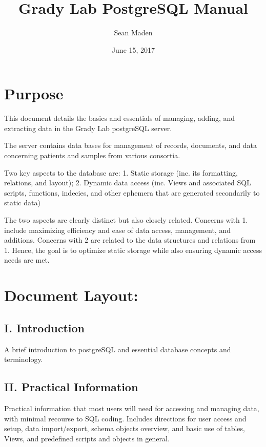 \documentclass[]{article}
\title{Grady Lab PostgreSQL Manual}
\author{Sean Maden}
\date{June 15, 2017}
\begin{document}
\maketitle

\section{Purpose}\label{purpose}

This document details the basics and essentials of managing, adding, and
extracting data in the Grady Lab postgreSQL server.

The server contains data bases for management of records, documents, and
data concerning patients and samples from various consortia.

Two key aspects to the database are: 1. Static storage (inc. its
formatting, relations, and layout); 2. Dynamic data access (inc. Views
and associated SQL scripts, functions, indecies, and other ephemera that
are generated secondarily to static data)

The two aspects are clearly distinct but also closely related. Concerns
with 1. include maximizing efficiency and ease of data access,
management, and additions. Concerns with 2 are related to the data
structures and relations from 1. Hence, the goal is to optimize static
storage while also ensuring dynamic access needs are met.

\section{Document Layout:}\label{document-layout}

\subsection{I. Introduction}\label{i.-introduction}

A brief introduction to postgreSQL and essential database concepts and
terminology.

\subsection{II. Practical Information}\label{ii.-practical-information}

Practical information that most users will need for accessing and
managing data, with minimal recourse to SQL coding. Includes directions
for user access and setup, data import/export, schema objects overview,
and basic use of tables, Views, and predefined scripts and objects in
general.
\end{document}
